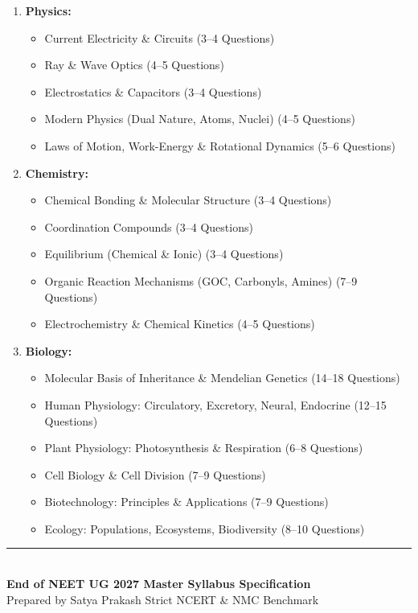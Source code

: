 \documentclass[11pt,a4paper]{article}
\begin{document}
\begin{enumerate}
  \item \textbf{Physics:}
  \begin{itemize}
    \item Current Electricity \& Circuits (3--4 Questions)
    \item Ray \& Wave Optics (4--5 Questions)
    \item Electrostatics \& Capacitors (3--4 Questions)
    \item Modern Physics (Dual Nature, Atoms, Nuclei) (4--5 Questions)
    \item Laws of Motion, Work-Energy \& Rotational Dynamics (5--6 Questions)
  \end{itemize}
  \item \textbf{Chemistry:}
  \begin{itemize}
    \item Chemical Bonding \& Molecular Structure (3--4 Questions)
    \item Coordination Compounds (3--4 Questions)
    \item Equilibrium (Chemical \& Ionic) (3--4 Questions)
    \item Organic Reaction Mechanisms (GOC, Carbonyls, Amines) (7--9 Questions)
    \item Electrochemistry \& Chemical Kinetics (4--5 Questions)
  \end{itemize}
  \item \textbf{Biology:}
  \begin{itemize}
    \item Molecular Basis of Inheritance \& Mendelian Genetics (14--18 Questions)
    \item Human Physiology: Circulatory, Excretory, Neural, Endocrine (12--15 Questions)
    \item Plant Physiology: Photosynthesis \& Respiration (6--8 Questions)
    \item Cell Biology \& Cell Division (7--9 Questions)
    \item Biotechnology: Principles \& Applications (7--9 Questions)
    \item Ecology: Populations, Ecosystems, Biodiversity (8--10 Questions)
  \end{itemize}
\end{enumerate}

\vspace{15pt}
\begin{center}
  \rule{0.6\textwidth}{0.8pt}\\[6pt]
  {\small\textbf{\color{primarydark}End of NEET UG 2027 Master Syllabus Specification}}\\[2pt]
  {\footnotesize\color{accentblue}Prepared by Satya Prakash \quad\textbar\quad Strict NCERT \& NMC Benchmark}
\end{center}
\end{document}
